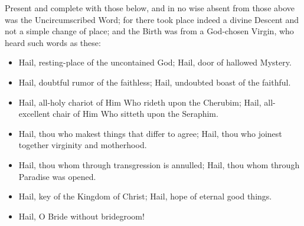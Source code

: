 \documentclass[twoside, letterpaper, 12pt]{report}
\begin{document}




\begin{priest}
  \item Present and complete with those below, and in no wise absent from those above was
  the Uncircumscribed Word; for there took place indeed a divine Descent and not a
  simple change of place; and the Birth was from a God-chosen Virgin, who heard such
  words as these:
\end{priest}

\begin{itemize}[label=\tiny{+},leftmargin=*]
\item Hail, resting-place of the uncontained God;
      Hail, door of hallowed Mystery.
\item Hail, doubtful rumor of the faithless; Hail, undoubted boast of the faithful.
\item Hail, all-holy chariot of Him Who rideth upon the Cherubim; Hail, all-excellent chair of Him
Who sitteth upon the Seraphim.
\item Hail, thou who makest things that differ to agree; Hail, thou who joinest together virginity and
motherhood.
\item Hail, thou whom through transgression is annulled; Hail, thou whom through Paradise was
opened.
\item Hail, key of the Kingdom of Christ; Hail, hope of eternal good things.
\item Hail, O Bride without bridegroom! 
\end{itemize}



\end{document}
